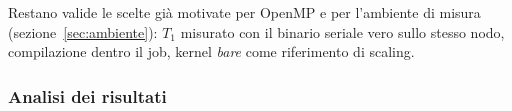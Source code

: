 Restano valide le scelte già motivate per OpenMP e per l'ambiente di misura
(sezione~\ref{sec:ambiente}): $T_1$ misurato con il binario seriale vero sullo
stesso nodo, compilazione dentro il job, kernel \emph{bare} come riferimento di
scaling.

\subsubsection{Analisi dei risultati}
\label{sec:mpi-risultati}


